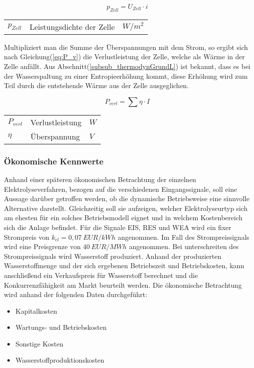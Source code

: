 \documentclass[onecolumn,10pt,titlepage]{article}
\begin{document}
			\begin{equation}
			\label{eq:p_zell}
			p_{Zell} = U_{Zell}\cdot i
			\end{equation}
			
			\begin{table}[H]
				\begin{tabular*}{\textwidth}{lll}
					$p_{Zell}$&Leistungsdichte der Zelle&$W/m^2$\\
				\end{tabular*}
			\end{table}
			
			Multipliziert man die Summe der Überspannungen mit dem Strom, so ergibt sich nach Gleichung(\ref{eq:P_v}) die Verlustleistung der Zelle, welche als Wärme in der Zelle anfällt. Aus Abschnitt(\ref{subsub_thermodynGrundL}) ist bekannt, dass es bei der Wasserspaltung zu einer Entropieerhöhung kommt, diese Erhöhung wird zum Teil durch die entstehende Wärme aus der Zelle ausgeglichen.
			
			\begin{equation}
			\label{eq:P_v}
			P_{verl} = \sum{\eta}\cdot I
			\end{equation}
			
			\begin{table}[H]
				\begin{tabular*}{\textwidth}{lll}
					$P_{verl}$&Verlustleistung&$W$\\
					$\eta$&Überspannung&$V$\\
				\end{tabular*}
			\end{table}
			
			
			\subsubsection*{Ökonomische Kennwerte}
			Anhand einer späteren ökonomischen Betrachtung der einzelnen Elektrolyseverfahren, bezogen auf die verschiedenen Eingangssignale, soll eine Aussage darüber getroffen werden, ob die dynamische Betriebsweise eine sinnvolle Alternative darstellt. Gleichzeitig soll sie aufzeigen, welcher Elektrolyseurtyp sich am ehesten für ein solches Betriebsmodell eignet und in welchem Kostenbereich sich die Anlage befindet. Für die Signale EIS, RES und WEA wird ein fixer Strompreis von $k_{el}= 0,07~EUR/kWh$ angenommen.\cite{DeutscheEnergieAgenturGmbH.06.2018} Im Fall des Strompreissignals wird eine Preisgrenze von $40~EUR/MWh$ angenommen. Bei unterschreiten des Strompreissignals wird Wasserstoff produziert. Anhand der produzierten Wasserstoffmenge und der sich ergebenen Betriebszeit und Betriebskosten, kann anschließend ein Verkaufspreis für Wasserstoff berechnet und die Konkurrenzfähigkeit am Markt beurteilt werden. Die ökonomische Betrachtung wird anhand der folgenden Daten durchgeführt:
			\begin{itemize}
				\item Kapitalkosten
				\item Wartungs- und Betriebskosten
				\item Sonstige Kosten
				\item Wasserstoffproduktionskosten
			\end{itemize}
	
\end{document}
